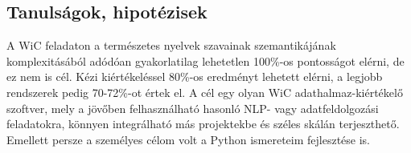 \documentclass[12pt]{report}
\theoremstyle{definition}
\begin{document}















\subsection{Tanulságok, hipotézisek}
A WiC feladaton a természetes nyelvek szavainak szemantikájának komplexitásából adódóan gyakorlatilag lehetetlen 100\%-os pontosságot elérni, de ez nem is cél. Kézi kiértékeléssel 80\%-os eredményt lehetett elérni, a legjobb rendszerek pedig 70-72\%-ot értek el. A cél egy olyan WiC adathalmaz-kiértékelő szoftver, mely a jövőben felhasználható hasonló NLP- vagy adatfeldolgozási feladatokra, könnyen integrálható más projektekbe és széles skálán terjeszthető. Emellett persze a személyes célom volt a Python ismereteim fejlesztése is.
\end{document}

